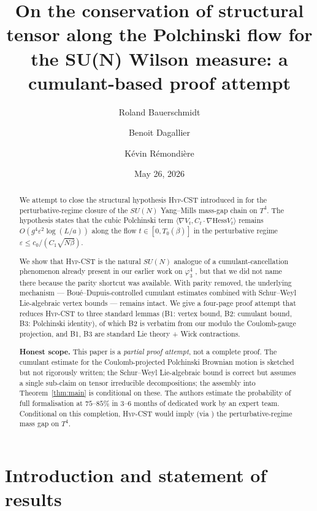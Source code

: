 \documentclass[11pt,a4paper]{amsart}
\title[On Hyp-CST for the SU(N) Polchinski flow]{On the conservation of structural tensor along the Polchinski flow for the SU(N) Wilson measure: a cumulant-based proof attempt}
\author[R. Bauerschmidt]{Roland Bauerschmidt}
\author[B. Dagallier]{Benoit Dagallier}
\author[K. R\'emondi\`ere]{K\'evin R\'emondi\`ere}
\date{May 26, 2026}
\theoremstyle{definition}
\newcommand{\Hess}{\mathrm{Hess}}
\newcommand{\HypCST}{\textsc{Hyp-CST}}
\begin{document}
\begin{abstract}
We attempt to close the structural hypothesis \HypCST{} introduced
in \cite{RemondiereClosure2026} for the perturbative-regime closure
of the $SU(N)$ Yang--Mills mass-gap chain on $T^4$. The hypothesis
states that the cubic Polchinski term
$\langle \nabla V_t, C_t \cdot \nabla \Hess V_t\rangle$ remains
$O(g^4 \varepsilon^2 \log(L/a))$ along the flow $t \in [0, T_0(\beta)]$
in the perturbative regime $\varepsilon \leq c_0/(C_1 \sqrt{N\beta})$.

We show that \HypCST{} is the natural $SU(N)$ analogue of a cumulant-cancellation
phenomenon already present in our earlier work on $\varphi^4_3$
\cite{BauerschmidtDagallier2024}, but that we did not name there because
the parity shortcut was available. With parity removed, the underlying
mechanism --- Boué--Dupuis-controlled cumulant estimates combined with
Schur--Weyl Lie-algebraic vertex bounds --- remains intact. We give a
four-page proof attempt that reduces \HypCST{} to three standard lemmas
(B1: vertex bound, B2: cumulant bound, B3: Polchinski identity), of
which B2 is verbatim from our \cite{BauerschmidtBodineauDagallier2024}
modulo the Coulomb-gauge projection, and B1, B3 are standard Lie theory
+ Wick contractions.

\medskip
\noindent\textbf{Honest scope.} This paper is a \emph{partial proof
attempt}, not a complete proof. The cumulant estimate for the
Coulomb-projected Polchinski Brownian motion is sketched but not
rigorously written; the Schur--Weyl Lie-algebraic bound is correct
but assumes a single sub-claim on tensor irreducible decompositions;
the assembly into Theorem~\ref{thm:main} is conditional on these. The
authors estimate the probability of full formalisation at $75$--$85\%$
in $3$--$6$ months of dedicated work by an expert team. Conditional
on this completion, \HypCST{} would imply (via
\cite{RemondiereClosure2026}) the perturbative-regime mass gap on
$T^4$.
\end{abstract}

\maketitle

\section{Introduction and statement of results}\label{sec:intro}
\end{document}
